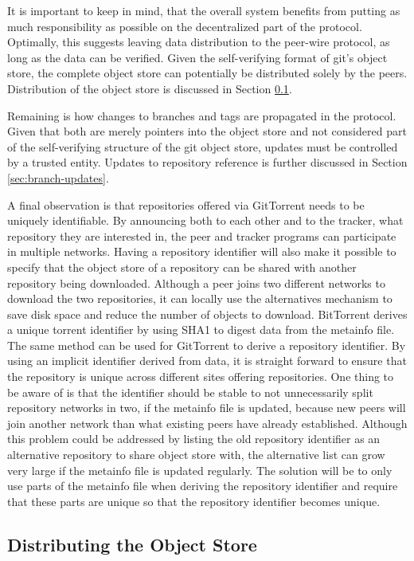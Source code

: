 It is important to keep in mind, that the overall system benefits from
putting as much responsibility as possible on the decentralized part
of the protocol. Optimally, this suggests leaving data distribution to
the peer-wire protocol, as long as the data can be verified. Given the
self-verifying format of git's object store, the complete object store can
potentially be distributed solely by the peers. Distribution of the
object store is discussed in Section \ref{sec:obj-store}.

Remaining is how changes to branches and tags are propagated in the
protocol. Given that both are merely pointers into the object store
and not considered part of the self-verifying structure of the git
object store, updates must be controlled by a trusted entity. Updates
to repository reference is further discussed in Section
\ref{sec:branch-updates}.

A final observation is that repositories offered via GitTorrent needs
to be uniquely identifiable. By announcing both to each other and to
the tracker, what repository they are interested in, the peer and
tracker programs can participate in multiple networks. Having a
repository identifier will also make it possible to specify that the
object store of a repository can be shared with another repository
being downloaded. Although a peer joins two different networks to
download the two repositories, it can locally use the alternatives
mechanism to save disk space and reduce the number of objects to
download.  BitTorrent derives a unique torrent identifier by using
SHA1 to digest data from the metainfo file.  The same method can be
used for GitTorrent to derive a repository identifier. By using an
implicit identifier derived from data, it is straight forward to
ensure that the repository is unique across different sites offering
repositories.  One thing to be aware of is that the identifier should
be stable to not unnecessarily split repository networks in two, if
the metainfo file is updated, because new peers will join another
network than what existing peers have already established. Although
this problem could be addressed by listing the old repository
identifier as an alternative repository to share object store with,
the alternative list can grow very large if the metainfo file is
updated regularly. The solution will be to only use parts of the
metainfo file when deriving the repository identifier and require that
these parts are unique so that the repository identifier becomes
unique.

\subsection{Distributing the Object Store}
\label{sec:obj-store}

